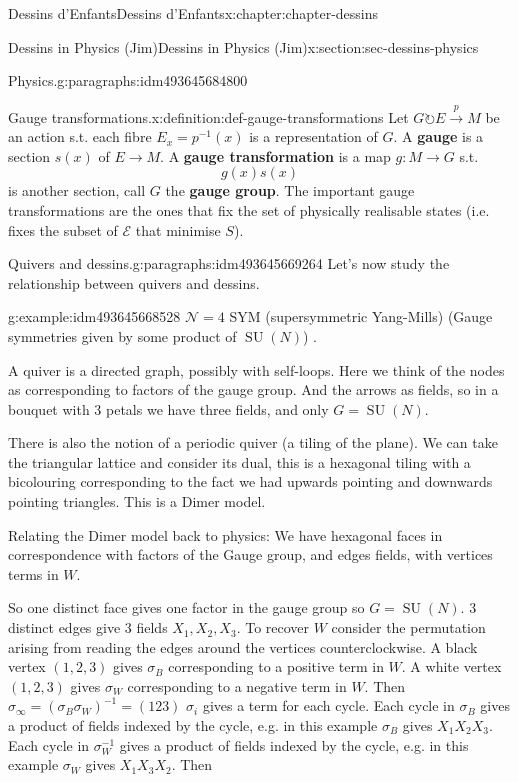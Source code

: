 \documentclass[oneside,10pt,]{book}
\newcommand{\terminology}[1]{\textbf{#1}}
\numberwithin{equation}{section}
\newcommand{\inv}{^{-1}}
\newcommand{\acts}{\circlearrowright}
\DeclareMathOperator{\specialunitary}{SU}
\begin{document}
\begin{chapterptx}{Dessins d'Enfants}{}{Dessins d'Enfants}{}{}{x:chapter:chapter-dessins}
\begin{sectionptx}{Dessins in Physics (Jim)}{}{Dessins in Physics (Jim)}{}{}{x:section:sec-dessins-physics}
\begin{paragraphs}{Physics.}{g:paragraphs:idm493645684800}
\begin{definition}{Gauge transformations.}{x:definition:def-gauge-transformations}
Let \(G \acts E \xrightarrow p M\) be an action s.t. each fibre \(E_x = p \inv(x)\) is a representation of \(G\). A \terminology{gauge} is a section \(s(x)\) of \(E \to M\). A \terminology{gauge transformation} is a map \(g\colon M \to G\) s.t.%
\begin{equation*}
g(x) s(x)
\end{equation*}
is another section, call \(G\) the \terminology{gauge group}. The important gauge transformations are the ones that fix the set of physically realisable states (i.e. fixes the subset of \(\mathcal E\) that minimise \(S\)).%
\end{definition}
\end{paragraphs}%
\begin{paragraphs}{Quivers and dessins.}{g:paragraphs:idm493645669264}%
Let's now study the relationship between quivers and dessins.%
\begin{example}{}{g:example:idm493645668528}%
\(\mathcal N = 4\) SYM (supersymmetric Yang-Mills) (Gauge symmetries given by some product of \(\specialunitary (N)\)) .%
\end{example}
A quiver is a directed graph, possibly with self-loops. Here we think of the nodes as corresponding to factors of the gauge group. And the arrows as fields, so in a bouquet with 3 petals we have three fields, and only \(G = \specialunitary (N)\).%
\par
There is also the notion of a periodic quiver (a tiling of the plane). We can take the triangular lattice and consider its dual, this is a hexagonal tiling with a bicolouring corresponding to the fact we had upwards pointing and downwards pointing triangles. This is a Dimer model.%
\par
Relating the Dimer model back to physics: We have hexagonal faces in correspondence with factors of the Gauge group, and edges fields, with vertices terms in \(W\).%
\par
So one distinct face gives one factor in the gauge group so \(G = \specialunitary (N)\). 3 distinct edges give 3 fields \(X_1, X_2, X_3\). To recover \(W\) consider the permutation arising from reading the edges around the vertices counterclockwise. A black vertex \((1,2,3)\) gives \(\sigma_B\) corresponding to a positive term in \(W\). A white vertex \((1,2,3)\) gives \(\sigma_W\) corresponding to a negative term in \(W\). Then \(\sigma_\infty = (\sigma_B\sigma_W)\inv = (123)\) \(\sigma_i\) gives a term for each cycle. Each cycle in \(\sigma_B\) gives a product of fields indexed by the cycle, e.g. in this example \(\sigma_B\) gives \(X_1X_2X_3\). Each cycle in \(\sigma_W\inv\) gives a product of fields indexed by the cycle, e.g. in this example \(\sigma_W\) gives \(X_1X_3X_2\). Then%

\end{paragraphs}
\end{sectionptx}
\end{chapterptx}
\end{document}
